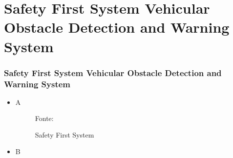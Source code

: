 \documentclass[xcolor=dvipsnames, aspectratio=169]{beamer}
\begin{document}
\section[Safety First System Vehicular Obstacle Detection and Warning System]{Safety First System Vehicular Obstacle Detection and Warning System} 

\begin{frame}
\frametitle{Safety First System Vehicular Obstacle Detection and Warning System}
	\begin{itemize}
		\item A
        \begin{figure}
            \centering
            {Fonte: \cite{everett1995sensors}}
            \caption{Safety First System}
            \label{fig:curva_de_freq}
        \end{figure}

        \item B


\end{itemize}
\end{frame}
\end{document}
